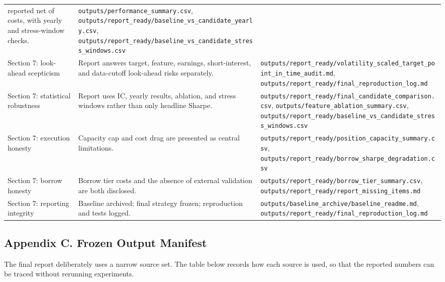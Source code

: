 \documentclass[
]{article}
\begin{document}
\begin{longtable}[]{@{}lll@{}}
reported net of costs, with yearly and stress-window checks. &
\texttt{outputs/performance\_summary.csv},
\texttt{outputs/report\_ready/baseline\_vs\_candidate\_yearly.csv},
\texttt{outputs/report\_ready/baseline\_vs\_candidate\_stress\_windows.csv} \\
Section 7: look-ahead scepticism & Report answers target, feature,
earnings, short-interest, and data-cutoff look-ahead risks separately. &
\texttt{outputs/report\_ready/volatility\_scaled\_target\_point\_in\_time\_audit.md},
\texttt{outputs/report\_ready/final\_reproduction\_log.md} \\
Section 7: statistical robustness & Report uses IC, yearly results,
ablation, and stress windows rather than only headline Sharpe. &
\texttt{outputs/report\_ready/final\_candidate\_comparison.csv},
\texttt{outputs/feature\_ablation\_summary.csv},
\texttt{outputs/report\_ready/baseline\_vs\_candidate\_stress\_windows.csv} \\
Section 7: execution honesty & Capacity cap and cost drag are presented
as central limitations. &
\texttt{outputs/report\_ready/position\_capacity\_summary.csv},
\texttt{outputs/report\_ready/borrow\_sharpe\_degradation.csv} \\
Section 7: borrow honesty & Borrow tier costs and the absence of
external validation are both disclosed. &
\texttt{outputs/report\_ready/borrow\_tier\_summary.csv},
\texttt{outputs/report\_ready/report\_missing\_items.md} \\
Section 7: reporting integrity & Baseline archived; final strategy
frozen; reproduction and tests logged. &
\texttt{outputs/baseline\_archive/baseline\_readme.md},
\texttt{outputs/report\_ready/final\_reproduction\_log.md} \\
\bottomrule
\end{longtable}

\hypertarget{appendix-c-frozen-output-manifest}{%
\subsection{Appendix C. Frozen Output
Manifest}\label{appendix-c-frozen-output-manifest}}

The final report deliberately uses a narrow source set. The table below
records how each source is used, so that the reported numbers can be
traced without rerunning experiments.
\end{document}
